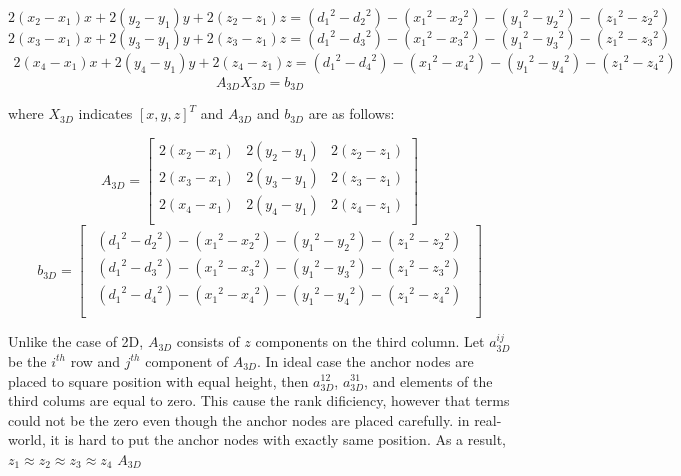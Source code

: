 \documentclass{ieeeaccess}
\begin{document}
\begin{equation}
2(x_2-x_1)x+2(y_2-y_1)y+2(z_2-z_1)z =  
({d_1}^2-{d_2}^2)-({x_1}^2-{x_2}^2)-({y_1}^2-{y_2}^2)-({z_1}^2-{z_2}^2)
\end{equation}
\begin{equation}
2(x_3-x_1)x+2(y_3-y_1)y+2(z_3-z_1)z=
({d_1}^2-{d_3}^2)-({x_1}^2-{x_3}^2)-({y_1}^2-{y_3}^2)-({z_1}^2-{z_3}^2)
\end{equation}
\begin{equation}
\substack{
	2(x_4-x_1)x+2(y_4-y_1)y+2(z_4-z_1)z=
	({d_1}^2-{d_4}^2)-({x_1}^2-{x_4}^2)-({y_1}^2-{y_4}^2)-({z_1}^2-{z_4}^2)
}
\end{equation}
\begin{equation}
A_{3D}X_{3D}=b_{3D}
\end{equation}

where $X_{3D}$ indicates $[x,y,z]^T$ and $A_{3D}$ and $b_{3D}$ are as follows: 

\begin{equation}
A_{3D} =\left[ {\begin{array}{ccc}
	2(x_2-x_1) & 2(y_2-y_1) & 2(z_2-z_1)\\
	2(x_3-x_1) & 2(y_3-y_1) & 2(z_3-z_1)\\
	2(x_4-x_1) & 2(y_4-y_1) & 2(z_4-z_1)\\
	\end{array} } \right]
\end{equation}
\begin{equation}
b_{3D} = \left[ {\begin{array}{c}
	\substack{
		({d_1}^2-{d_2}^2)-({x_1}^2-{x_2}^2)-({y_1}^2-{y_2}^2)-({z_1}^2-{z_2}^2)\\
		({d_1}^2-{d_3}^2)-({x_1}^2-{x_3}^2)-({y_1}^2-{y_3}^2)-({z_1}^2-{z_3}^2)\\
		({d_1}^2-{d_4}^2)-({x_1}^2-{x_4}^2)-({y_1}^2-{y_4}^2)-({z_1}^2-{z_4}^2)\\
	}
	\end{array} } \right]
\end{equation}

Unlike the case of 2D, $A_{3D}$ consists of $z$ components on the third column. Let $a_{3D}^{ij}$ be the $i^{th}$ row and $j^{th}$ component of $A_{3D}$. In ideal case the anchor nodes are placed to square position with equal height, then $a_{3D}^{12}$, $a_{3D}^{31}$, and elements of the third colums are equal to zero. This cause the rank dificiency, however that terms could not be the zero even though the anchor nodes are placed carefully. in real-world, it is hard to put the anchor nodes with exactly same position. As a result, $z_1\approx z_2\approx z_3\approx z_4$ $A_{3D}$  
\end{document}
